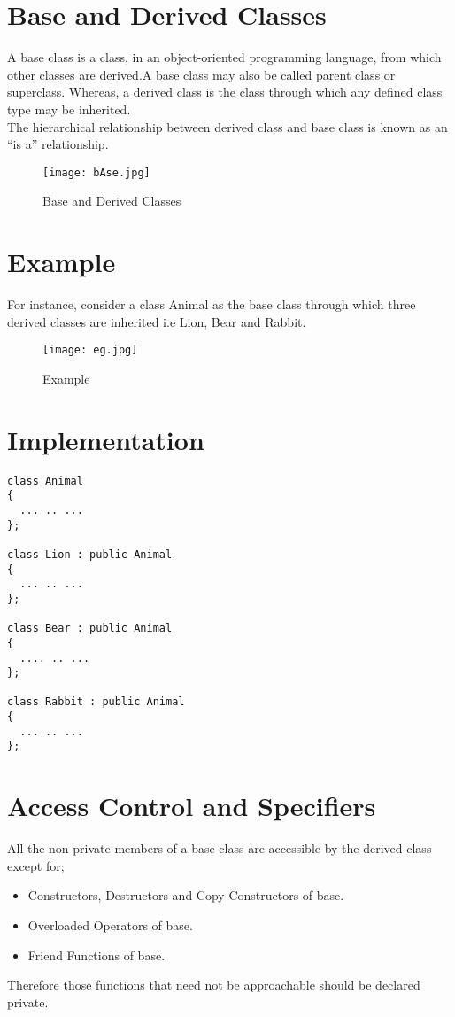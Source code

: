 \documentclass[11pt,fleqn]{book} %
\begin{document}
\section{Base and Derived Classes}

A base class is a class, in an object-oriented programming language, from which other classes are derived.A base class may also be called parent class or superclass. Whereas, a derived class is the class through which any defined class type may be inherited.\\
The hierarchical relationship between derived class and base class is known as an “is a” relationship.
\begin{figure}[h]
	\centering\texttt{[image: bAse.jpg]}
	\caption{Base and Derived Classes}
\end{figure}

\newpage
\section{Example}

For instance, consider a class Animal as the base class through which three derived classes are inherited i.e Lion, Bear and Rabbit.

\begin{figure}[h]
	\centering\texttt{[image: eg.jpg]}
	\caption{Example}
\end{figure}
\hfill

\newpage
\section{Implementation}
\begin{lstlisting}
class Animal 
{
  ... .. ...
};

class Lion : public Animal
{
  ... .. ...
};

class Bear : public Animal
{
  .... .. ...
};

class Rabbit : public Animal 
{
  ... .. ...
};
\end{lstlisting}
\hfill 
\section{Access Control and Specifiers}
 All the non-private members of a base class are accessible by the derived class except for;
 
 \begin{itemize}
 \item Constructors, Destructors and Copy Constructors of base.
 \item Overloaded Operators of base.
 \item Friend Functions of base.
 \end{itemize}
 Therefore those functions that need not be approachable should be declared private.
\end{document}
